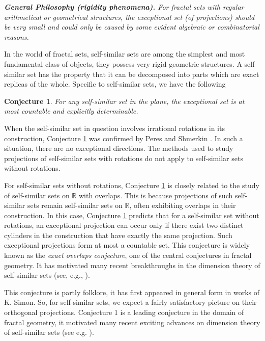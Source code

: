 \documentclass[a4paper,11pt]{amsart}
\newtheorem{conjecture}[theorem]{Conjecture}
\theoremstyle{definition}
\numberwithin{equation}{section}
\def\R{\mathbb R}
\begin{document}
\medskip

{\em 
{\bf General Philosophy (rigidity phenomena).} For fractal sets with regular arithmetical or geometrical structures,  the exceptional set (of projections) should be very small and could only be caused by some evident algebraic or combinatorial reasons.
}
\medskip

In the world of fractal sets,    self-similar sets are among  the simplest and most fundamental class of objects, they possess very rigid  geometric structures.  A self-similar set has the property that it can be decomposed into parts which are exact replicas of the whole.  Specific to self-similar sets,   we have the following 
\begin{conjecture}\label{conj:proj-self-similar:1}
For any self-similar set  in the plane, the exceptional set  is at most
countable and explicitly determinable.
\end{conjecture}

When the self-similar set in question involves irrational rotations in its construction, Conjecture \ref{conj:proj-self-similar:1} was confirmed by Peres and Shmerkin \cite{Peres-Shmerkin}. In such a situation, there are no exceptional directions. The methods used to study projections of self-similar sets with rotations do not apply to self-similar sets without rotations.

For self-similar sets without rotations, Conjecture \ref{conj:proj-self-similar:1} is closely related to the study of self-similar sets on $\R$
with overlaps. This is because projections of such self-similar sets remain self-similar sets on 
$\R$,  often exhibiting overlaps in their construction. In this case, Conjecture \ref{conj:proj-self-similar:1} predicts that for a self-similar set without rotations, an exceptional projection can occur only if there exist two distinct cylinders in the construction that have exactly the same projection. Such exceptional projections form at most a countable set.
This conjecture is widely known as the {\em exact overlaps conjecture}, one of the central conjectures in fractal geometry. It has motivated many recent breakthroughs in the dimension theory of self-similar sets (see, e.g., \cite{Hochman-ICM,Varju-ICM}).

\iffalse
This conjecture is partly folklore, it has first appeared in general form in works of K.  Simon.   So, for self-similar sets, we expect a fairly satisfactory picture on their orthogonal projections. Conjecture 1 is a   leading conjecture in the domain of fractal geometry,  it motivated many recent exciting advances on dimension theory of self-similar sets (see e.g.  \cite{Hochman-ICM,Varju-ICM}).  
\end{document}
